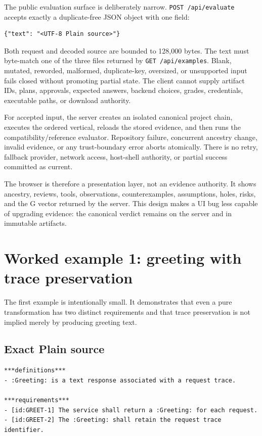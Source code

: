 \documentclass[11pt]{article}
\newcommand{\code}[1]{\texttt{#1}}
\begin{document}
The public evaluation surface is deliberately narrow.  \code{POST
/api/evaluate} accepts exactly a duplicate-free JSON object with one field:

\begin{lstlisting}[language={}]
{"text": "<UTF-8 Plain source>"}
\end{lstlisting}

Both request and decoded source are bounded to 128,000 bytes.  The text must
byte-match one of the three files returned by \code{GET /api/examples}.
Blank, mutated, reworded, malformed, duplicate-key, oversized, or unsupported
input fails closed without promoting partial state.  The client cannot supply
artifact IDs, plans, approvals, expected answers, backend choices, grades,
credentials, executable paths, or download authority.

For accepted input, the server creates an isolated canonical project chain,
executes the ordered vertical, reloads the stored evidence, and then runs the
compatibility/reference evaluator.  Repository failure, concurrent ancestry
change, invalid evidence, or any trust-boundary error aborts atomically.  There
is no retry, fallback provider, network access, host-shell authority, or
partial success committed as current.

The browser is therefore a presentation layer, not an evidence authority.  It
shows ancestry, reviews, tools, observations, counterexamples, assumptions,
holes, risks, and the G vector returned by the server.  This design makes a UI
bug less capable of upgrading evidence: the canonical verdict remains on the
server and in immutable artifacts.

\section{Worked example 1: greeting with trace preservation}

The first example is intentionally small.  It demonstrates that even a pure
transformation has two distinct requirements and that trace preservation is
not implied merely by producing greeting text.

\subsection{Exact Plain source}

\begin{lstlisting}[language={}]
***definitions***
- :Greeting: is a text response associated with a request trace.

***requirements***
- [id:GREET-1] The service shall return a :Greeting: for each request.
- [id:GREET-2] The :Greeting: shall retain the request trace identifier.
\end{lstlisting}
\end{document}
